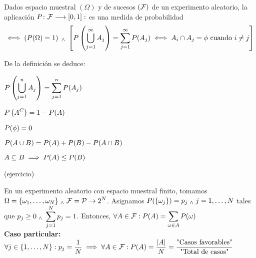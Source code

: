 \begin{defn} 
	Dados espacio muestral $(\Omega)$ y de sucesos $(\mathcal{F})$ de un experimento aleatorio, la aplicación $P \colon \mathcal{F} \longrightarrow [0, 1] : $ es una medida de probabilidad
	\[ \iff \left(P(\Omega) = 1\right) \; _{\wedge} \; \left[P\left(\bigcup_{j=1}^{\infty} A_j\right) = \sum_{j=1}^{\infty} P(A_j) \iff A_i\cap A_j = \phi \text{ cuando } i \ne j\right] \]
\end{defn}
\begin{prop}
	De la definición se deduce: \\
	\begin{enumerate*}[itemjoin=\hspace{1cm}]
		\item $\displaystyle P\left(\bigcup_{j=1}^n A_j\right) = \sum_{j=1}^{n} P(A_j)$
		\item $\displaystyle P\left(A^C\right) = 1-P(A)$
		\item $\displaystyle P(\phi) = 0$ \\
		\item $\displaystyle P(A\cup B) = P(A) + P(B) - P(A\cap B)$
		\item $\displaystyle A \subseteq B \implies P(A) \leq P(B)$
	\end{enumerate*}
\end{prop}
\begin{dem}
	(ejercicio)
\end{dem}
\begin{ejem}
	En un experimento aleatorio con espacio muestral finito, tomamos \\
	$\displaystyle \Omega = \{\omega_1, \dots, \omega_N\}  \; _{\wedge} \; \mathcal{F} = \mathcal{P} \rightarrow 2^N$. Asignamos $\displaystyle P(\{\omega_j\}) = p_j \; _{\wedge} \; j = 1, \dots, N$ tales que $\displaystyle p_j\geq 0 \; _{\wedge} \; \sum_{j=1}^{N} p_j = 1$. Entonces, $\displaystyle\forall A \in \mathcal{F} : P(A) = \sum_{\omega \in A} P(\omega)$ \\
	\textbf{Caso particular: }$\displaystyle \forall j \in \{1,\dots, N\} : p_j = \frac{1}{N} \implies \forall A \in \mathcal{F} : P(A) = \frac{|A|}{N} = \frac{\text{"Casos favorables"}}{\text{"Total de casos"}}$    
\end{ejem}

